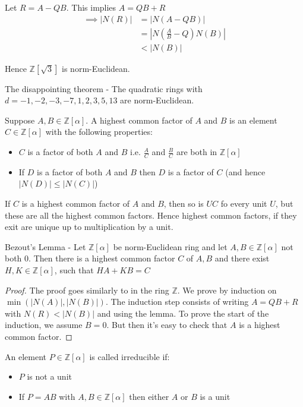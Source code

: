 \documentclass[11pt]{article}
\begin{document}
Let $R= A-QB$. This implies $A= QB +R$
\begin{align*}
	\implies |N(R)| &= |N(A-QB)|\\
	& = |N(\frac{A}{B} - Q ) N(B) |\\
	& < |N(B)| 
\end{align*}

Hence $\mathbb{Z}[\sqrt{3}]$ is norm-Euclidean.


\begin{theorem}
The disappointing theorem - The quadratic rings with $d = -1, -2, -3, -7, 1, 2, 3, 5, 13 $ are norm-Euclidean.
\end{theorem}

\begin{definition}
	Suppose $A, B \in \mathbb{Z}[\alpha]$. A highest common factor of $A $ and $B$ is an element $C \in \mathbb{Z}[\alpha]$ with the following properties:

	\begin{itemize}
		\item{$C$ is a factor of both $A $ and $B $ i.e. $\frac{A}{C}$ and $\frac{B}{C}$ are both in $\mathbb{Z}[\alpha]$}
		\item{If $D$ is a factor of both $A$ and $B$ then $D$ is a factor of $C$ (and hence$|N(D)| \leq |N(C)| $)}
	\end{itemize}
\end{definition}
	
	If $C$ is a highest common factor of $A$ and $B$, then so is $UC$ fo every unit $U$, but these are all the highest common factors. Hence highest common factors, if they exit are unique up to multiplication by a unit.

\begin{lemma}
	Bezout's Lemma - Let $\mathbb{Z}[\alpha] $ be norm-Euclidean ring and let $A,B \in \mathbb{Z}[\alpha]$ not both $0$. Then there is a highest common factor $C$ of $A,B $ and there exist $H, K \in \mathbb{Z}[\alpha]$, such that $HA+KB=C$ 
\end{lemma} 


\begin{proof}
	The proof goes similarly to in the ring $\mathbb{Z}$. We prove by induction on $\min(|N(A)|,|N(B)|)$. The induction step consists of writing $A=QB+R $ with $N(R)< |N(B)|$ and using the lemma. To prove the start of the induction, we assume $B=0$. But then it's easy to check that $A$ is a highest common factor.
\end{proof}


\begin{definition}
	An element $P \in \mathbb{Z}[\alpha] $ is called irreducible if:
	\begin{itemize}
		\item{$P$ is not a unit}
		\item{If $P=AB$ with $A,B \in \mathbb{Z}[\alpha]$ then either $A$ or $B$ is a unit }
	\end{itemize}
\end{definition}
\end{document}
